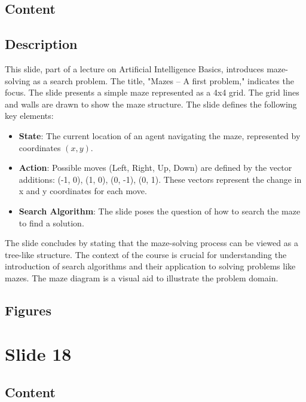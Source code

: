 \documentclass{article}%
\begin{document}
\subsection{Content}%
%
\subsection{Description}%
This slide, part of a lecture on Artificial Intelligence Basics, introduces maze-solving as a search problem.  The title, "Mazes – A first problem," indicates the focus.  The slide presents a simple maze represented as a 4x4 grid.  The grid lines and walls are drawn to show the maze structure.  The slide defines the following key elements:
\begin{itemize}
    \item \textbf{State}: The current location of an agent navigating the maze, represented by coordinates $(x, y)$.
    \item \textbf{Action}: Possible moves (Left, Right, Up, Down) are defined by the vector additions:  (-1, 0), (1, 0), (0, -1), (0, 1).  These vectors represent the change in x and y coordinates for each move.
    \item \textbf{Search Algorithm}: The slide poses the question of how to search the maze to find a solution.
\end{itemize}
The slide concludes by stating that the maze-solving process can be viewed as a tree-like structure.  The context of the course is crucial for understanding the introduction of search algorithms and their application to solving problems like mazes. The maze diagram is a visual aid to illustrate the problem domain.%
\subsection{Figures}%
\begin{figure}[H]%
\centering%
\end{figure}

%
\newpage%
\section{Slide 18}%
\label{sec:Slide18}%
\subsection{Content}%
\end{document}
